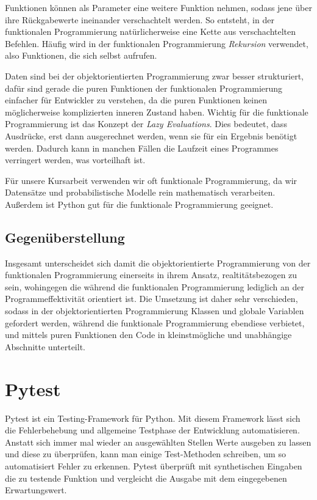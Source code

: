 \documentclass[]{dsadokumentation}
\begin{document}
Funktionen können als Parameter eine weitere Funktion nehmen, sodass jene über ihre Rückgabewerte ineinander verschachtelt werden. So entsteht, in der funktionalen Programmierung natürlicherweise eine Kette aus verschachtelten Befehlen. Häufig wird in der funktionalen Programmierung \emph{Rekursion} verwendet, also Funktionen, die sich selbst aufrufen.

Daten sind bei der objektorientierten Programmierung zwar besser strukturiert, dafür sind gerade die puren Funktionen der funktionalen Programmierung einfacher für Entwickler zu verstehen, da die puren Funktionen keinen möglicherweise komplizierten inneren Zustand haben. Wichtig für die funktionale Programmierung ist das Konzept der \emph{Lazy Evaluations}. Dies bedeutet, dass Ausdrücke, erst dann ausgerechnet werden, wenn sie für ein Ergebnis benötigt werden. Dadurch kann in manchen Fällen die Laufzeit eines Programmes verringert werden, was vorteilhaft ist.

Für unsere Kursarbeit verwenden wir oft funktionale Programmierung, da wir Datensätze und probabilistische Modelle rein mathematisch verarbeiten. Außerdem ist Python gut für die funktionale Programmierung geeignet.

\subsection{Gegenüberstellung}
Insgesamt unterscheidet sich damit die objektorientierte Programmierung von der funktionalen Programmierung einerseits in ihrem Ansatz, realtitätsbezogen zu sein, wohingegen die während die funktionalen Programmierung lediglich an der Programmeffektivität orientiert ist. Die Umsetzung ist daher sehr verschieden, sodass in der objektorientierten Programmierung Klassen und globale Variablen gefordert werden, während die funktionale Programmierung ebendiese verbietet, und mittels puren Funktionen den Code in kleinstmögliche und unabhängige Abschnitte unterteilt.

\section{Pytest}
Pytest ist ein Testing-Framework für Python. Mit diesem Framework lässt sich die Fehlerbehebung und allgemeine Testphase der Entwicklung automatisieren. Anstatt sich immer mal wieder an ausgewählten Stellen Werte ausgeben zu lassen und diese zu überprüfen, kann man einige Test-Methoden schreiben, um so automatisiert Fehler zu erkennen. Pytest überprüft mit synthetischen Eingaben die zu testende Funktion und vergleicht die Ausgabe mit dem eingegebenen Erwartungswert.
\end{document}

